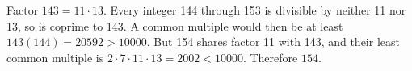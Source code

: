 Factor $143=11\cdot13$. Every integer 144 through 153 is divisible by neither 11 nor 13, so is coprime to 143. A common multiple would then be at least $143(144)=20592>10000$. But 154 shares factor 11 with 143, and their least common multiple is $2\cdot7\cdot11\cdot13=2002<10000$. Therefore $\boxed{154}$.
